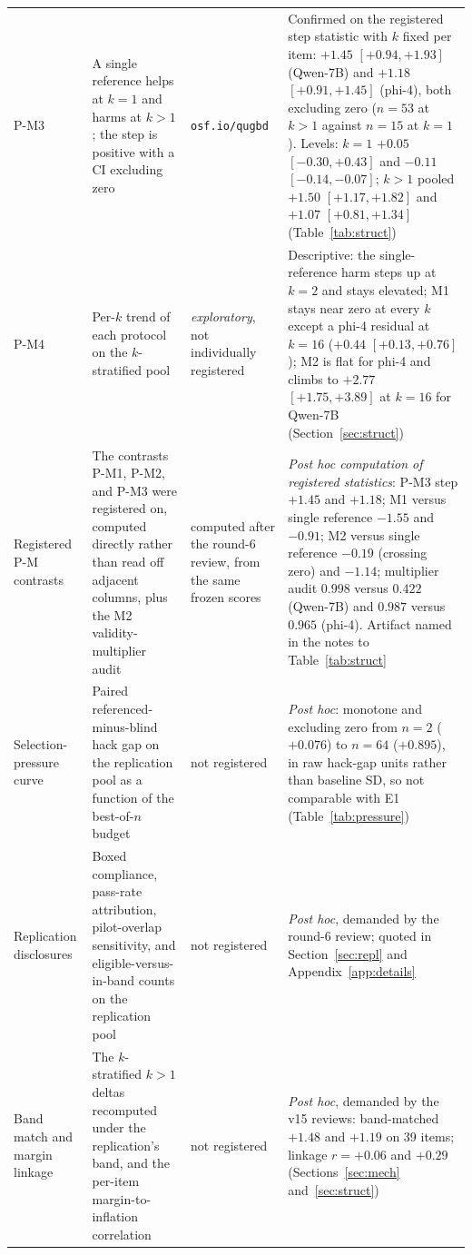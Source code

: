 \documentclass[11pt]{article}
\begin{document}
\begin{longtable}{L{1.7cm}L{5.3cm}L{2.5cm}L{5.1cm}}
\addlinespace[1pt]
P-M3 & A single reference helps at $k{=}1$ and harms at $k{>}1$; the step is positive with a CI excluding zero & \texttt{osf.io/qugbd} & Confirmed on the registered step statistic with $k$ fixed per item: $+1.45$ $[+0.94, +1.93]$ (Qwen-7B) and $+1.18$ $[+0.91, +1.45]$ (phi-4), both excluding zero ($n{=}53$ at $k{>}1$ against $n{=}15$ at $k{=}1$). Levels: $k{=}1$ $+0.05$ $[-0.30, +0.43]$ and $-0.11$ $[-0.14, -0.07]$; $k{>}1$ pooled $+1.50$ $[+1.17, +1.82]$ and $+1.07$ $[+0.81, +1.34]$ (Table~\ref{tab:struct}) \\
\addlinespace[1pt]
P-M4 & Per-$k$ trend of each protocol on the $k$-stratified pool & \emph{exploratory}, not individually registered & Descriptive: the single-reference harm steps up at $k{=}2$ and stays elevated; M1 stays near zero at every $k$ except a phi-4 residual at $k{=}16$ ($+0.44$ $[+0.13, +0.76]$); M2 is flat for phi-4 and climbs to $+2.77$ $[+1.75, +3.89]$ at $k{=}16$ for Qwen-7B (Section~\ref{sec:struct}) \\
\addlinespace[1pt]
Registered P-M contrasts & The contrasts P-M1, P-M2, and P-M3 were registered on, computed directly rather than read off adjacent columns, plus the M2 validity-multiplier audit & computed after the round-6 review, from the same frozen scores & \emph{Post hoc computation of registered statistics}: P-M3 step $+1.45$ and $+1.18$; M1 versus single reference $-1.55$ and $-0.91$; M2 versus single reference $-0.19$ (crossing zero) and $-1.14$; multiplier audit $0.998$ versus $0.422$ (Qwen-7B) and $0.987$ versus $0.965$ (phi-4). Artifact named in the notes to Table~\ref{tab:struct} \\
\addlinespace[1pt]
Selection-pressure curve & Paired referenced-minus-blind hack gap on the replication pool as a function of the best-of-$n$ budget & not registered & \emph{Post hoc}: monotone and excluding zero from $n{=}2$ ($+0.076$) to $n{=}64$ ($+0.895$), in raw hack-gap units rather than baseline SD, so not comparable with E1 (Table~\ref{tab:pressure}) \\
\addlinespace[1pt]
Replication disclosures & Boxed compliance, pass-rate attribution, pilot-overlap sensitivity, and eligible-versus-in-band counts on the replication pool & not registered & \emph{Post hoc}, demanded by the round-6 review; quoted in Section~\ref{sec:repl} and Appendix~\ref{app:details} \\
\addlinespace[1pt]
Band match and margin linkage & The $k$-stratified $k{>}1$ deltas recomputed under the replication's band, and the per-item margin-to-inflation correlation & not registered & \emph{Post hoc}, demanded by the v15 reviews: band-matched $+1.48$ and $+1.19$ on 39 items; linkage $r = +0.06$ and $+0.29$ (Sections~\ref{sec:mech} and~\ref{sec:struct}) \\

\end{longtable}
\end{document}
